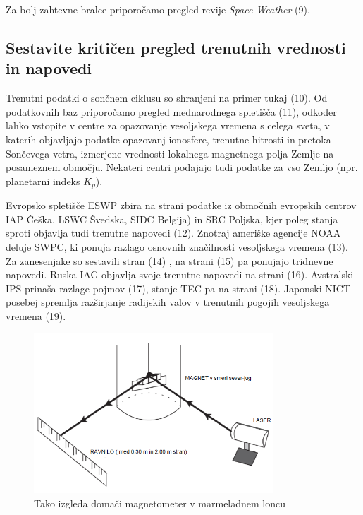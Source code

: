  
Za bolj zahtevne bralce priporočamo pregled revije \textit{Space Weather} (9).

\subsection{Sestavite kritičen pregled trenutnih vrednosti in napovedi}
\label{subsec:VesVrem_Podat}
Trenutni podatki o sončnem ciklusu so shranjeni na primer tukaj (10). Od podatkovnih baz priporočamo pregled mednarodnega spletišča (11), odkoder lahko vstopite v centre za opazovanje vesoljskega vremena s celega sveta, v katerih objavljajo podatke opazovanj ionosfere, trenutne hitrosti in pretoka Sončevega vetra, izmerjene vrednosti lokalnega magnetnega polja Zemlje na posameznem območju. Nekateri centri podajajo tudi podatke za vso Zemljo (npr. planetarni indeks $K_p$).

Evropsko spletišče ESWP zbira na strani podatke iz območnih evropskih centrov IAP Češka, LSWC Švedska, SIDC Belgija) in SRC Poljska, kjer poleg stanja sproti objavlja tudi trenutne napovedi (12). Znotraj ameriške agencije NOAA deluje SWPC, ki ponuja razlago osnovnih značilnosti vesoljskega vremena (13). Za zanesenjake so sestavili stran (14) , na strani (15) pa ponujajo tridnevne napovedi. Ruska IAG objavlja svoje trenutne napovedi na strani (16). Avstralski IPS prinaša razlage pojmov (17), stanje TEC pa na strani (18). Japonski NICT posebej spremlja razširjanje radijskih valov v trenutnih pogojih vesoljskega vremena (19).


\begin{figure}
	\centering
	\includegraphics[height=6cm]{Vaje/VesoljVreme/figs/Eksp.png}
	\caption{Tako izgleda domači magnetometer v marmeladnem loncu}
	\label{fig:VesVr_Eksp}       %
\end{figure}
 
